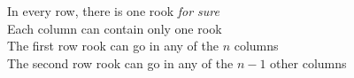 \documentclass[preview]{standalone}
\begin{document}
\begin{center}
In every row, there is one rook \textit{for sure} \\ Each column can contain only one rook \\ The first row rook can go in any of the $n$ columns \\ The second row rook can go in any of the $n - 1$ other columns
\end{center}
\end{document}
